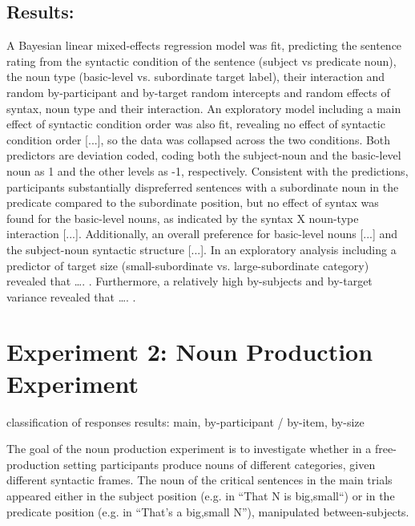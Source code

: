 \subsection{Results:}
A Bayesian linear mixed-effects regression model was fit, predicting the sentence rating from the syntactic condition of the sentence (subject vs predicate noun), the noun type (basic-level vs. subordinate target label), their interaction and random  by-participant and by-target random intercepts and random effects of syntax, noun type and their interaction. An exploratory model including a main effect of syntactic condition order was also fit, revealing no effect of syntactic condition order [...], so the data was collapsed across the two conditions. Both predictors are deviation coded, coding both the subject-noun and the basic-level noun as 1 and the other levels as -1, respectively. 
Consistent with the predictions, participants substantially dispreferred sentences with a subordinate noun in the predicate compared to the subordinate position, but no effect of syntax was found for the basic-level nouns, as indicated by the syntax X noun-type interaction [...]. Additionally, an overall preference for basic-level nouns [...] and the subject-noun syntactic structure [...]. In an exploratory analysis including a predictor of target size (small-subordinate vs. large-subordinate category) revealed that …. . Furthermore, a relatively high by-subjects  and by-target variance revealed that …. .


\section{Experiment 2: Noun Production Experiment}    

classification of responses
results: main, by-participant / by-item, by-size  

The goal of the noun production experiment is to investigate whether in a free-production setting participants produce nouns of different categories, given different syntactic frames.  The noun of the critical sentences in the main trials appeared either in the subject position (e.g. in “That N is {big,small}“) or in the predicate position (e.g. in “That’s a {big,small} N”), manipulated between-subjects. 

